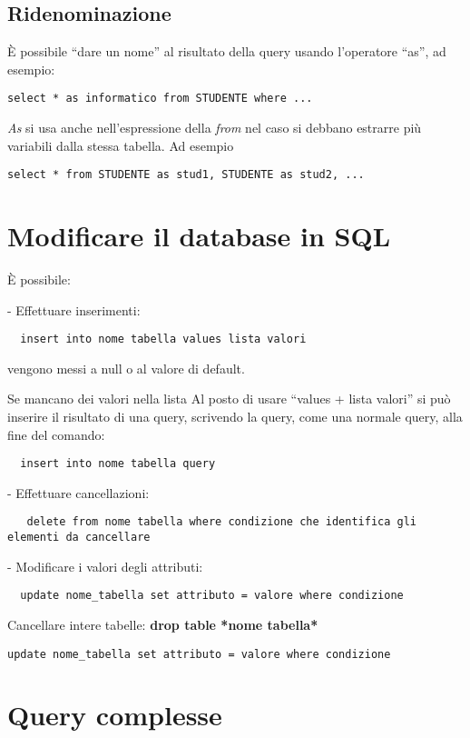 \documentclass[\main/main.tex]{subfiles}
\begin{document}
\subsection{Ridenominazione}
È possibile ``dare un nome'' al risultato della query usando l'operatore ``as'', ad esempio:
\begin{verbatim}
select * as informatico from STUDENTE where ...
\end{verbatim}
\textit{As} si usa anche nell'espressione della \textit{from} nel caso si debbano estrarre più variabili dalla stessa tabella.
Ad esempio
\begin{verbatim}
select * from STUDENTE as stud1, STUDENTE as stud2, ...
\end{verbatim}


\section{Modificare il database in SQL}
È possibile:

- Effettuare inserimenti:
\begin{verbatim}
  insert into nome tabella values lista valori
\end{verbatim}
vengono messi a null o al valore di default.

Se mancano dei valori nella lista
Al posto di usare ``values + lista valori'' si può inserire il risultato di una query, scrivendo la query, come una normale query, alla fine del comando:
\begin{verbatim}
  insert into nome tabella query
      \end{verbatim}


- Effettuare cancellazioni:
\begin{verbatim}
   delete from nome tabella where condizione che identifica gli elementi da cancellare
\end{verbatim}

- Modificare i valori degli attributi:
\begin{verbatim}
  update nome_tabella set attributo = valore where condizione
\end{verbatim}

Cancellare intere tabelle: \textbf{drop table *nome tabella*}

\begin{verbatim}
update nome_tabella set attributo = valore where condizione
\end{verbatim}

\section{Query complesse}
\end{document}
